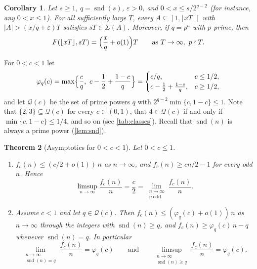 \documentclass[11pt,reqno]{amsart}
\numberwithin{equation}{section}
\newtheorem{theorem}{Theorem}[section]
\newtheorem{corollary}[theorem]{Corollary}
\theoremstyle{definition}
\theoremstyle{remark}
\newcommand{\eps}{\varepsilon}
\newcommand{\card}[1]{\lvert #1\rvert}
\newcommand{\floor}[1]{\lfloor #1\rfloor}
\newcommand{\snd}{\operatorname{snd}}
\newcommand{\Sig}{\Sigma}
\begin{document}
\begin{corollary}\label{cor:interval}
Let $s\ge1$, $q=\snd(s)$, $\eps>0$, and $0<x\le s/2^{q-2}$ (for instance, any $0<x\le1$). For all sufficiently large $T$, every $A\subseteq[1,\floor{xT}]$ with $\card A>(x/q+\eps)T$ satisfies $sT\in\Sig(A)$. Moreover, if $q=p^a$ with $p$ prime, then
\[
 F(\floor{xT},sT)=\Bigl(\frac xq+o(1)\Bigr)T\qquad\text{as } T\to\infty,\ p\nmid T .
\]
\end{corollary}

For $0<c<1$ let
\[
 \varphi_q(c)=\max\Bigl\{\frac cq,\ c-\frac12+\frac{1-c}q\Bigr\}
 =\begin{cases} c/q, & c\le 1/2,\\ c-\tfrac12+\tfrac{1-c}q, & c\ge1/2,\end{cases}
\]
and let $\mathcal Q(c)$ be the set of prime powers $q$ with $2^{q-2}\min\{c,1-c\}\le1$. Note that $\{2,3\}\subseteq\mathcal Q(c)$ for every $c\in(0,1)$, that $4\in\mathcal Q(c)$ if and only if $\min\{c,1-c\}\le1/4$, and so on (see \cref{tab:classes}). Recall that $\snd(n)$ is always a prime power (\cref{lem:snd}).

\begin{theorem}[Asymptotics for $0<c<1$]\label{thm:main}
Let $0<c\le1$.
\begin{enumerate}[label=\textup{(\roman*)}]
\item $f_c(n)\le(c/2+o(1))\,n$ as $n\to\infty$, and $f_c(n)\ge cn/2-1$ for every odd $n$. Hence
\[
 \limsup_{n\to\infty}\frac{f_c(n)}n=\frac c2=\lim_{\substack{n\to\infty\\ n\ \mathrm{odd}}}\frac{f_c(n)}n .
\]
\item Assume $c<1$ and let $q\in\mathcal Q(c)$. Then $f_c(n)\le(\varphi_q(c)+o(1))\,n$ as $n\to\infty$ through the integers with $\snd(n)\ge q$, and $f_c(n)\ge\varphi_q(c)\,n-q$ whenever $\snd(n)=q$. In particular
\[
 \lim_{\substack{n\to\infty\\ \snd(n)=q}}\frac{f_c(n)}n=\varphi_q(c)
 \qquad\text{and}\qquad
 \limsup_{\substack{n\to\infty\\ \snd(n)\ge q}}\frac{f_c(n)}n=\varphi_q(c).
\]
\end{enumerate}
\end{theorem}
\end{document}

